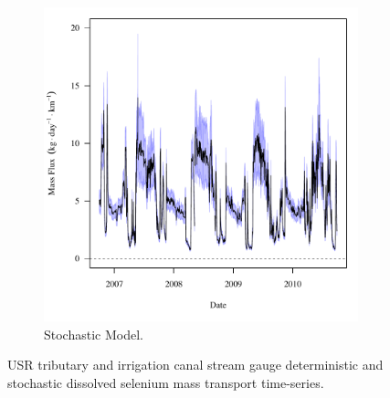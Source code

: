 \begin{landscape}
\begin{figure}
\begin{subfigure}{0.7\textwidth}
			\includegraphics[width=\tableCustomSize]{"Figures/Results_USR/Stochastic/f U201"}
			\caption{Stochastic Model.}
		\end{subfigure}
		\caption{USR tributary and irrigation canal stream gauge deterministic and stochastic dissolved selenium mass transport time-series.}
	\end{figure}
\end{landscape}
\subfiguremid
